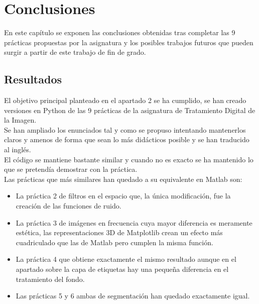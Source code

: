 \chapter{Conclusiones}
En este capítulo se exponen las conclusiones obtenidas tras completar las 9 prácticas propuestas por la asignatura y los posibles trabajos futuros que pueden surgir a partir de este trabajo de fin de grado. 

\section{Resultados}
El objetivo principal planteado en el apartado 2 se ha cumplido, se han creado versiones en Python de las 9 prácticas de la asignatura de Tratamiento Digital de la Imagen.\\

Se han ampliado los enunciados tal y como se propuso intentando mantenerlos claros y amenos de forma que sean lo más didácticos posible y se han traducido al inglés.\\

El código se mantiene bastante similar y cuando no es exacto se ha mantenido lo que se pretendía demostrar con la práctica.\\

Las prácticas que más similares han quedado a su equivalente en Matlab son:
\begin{itemize}
    \item La práctica 2 de filtros en el espacio que, la única modificación, fue la creación de las funciones de ruido.
    \item La práctica 3 de imágenes en frecuencia cuya mayor diferencia es meramente estética, las representaciones 3D de Matplotlib crean un efecto más cuadriculado que las de Matlab pero cumplen la misma función.
    \item La práctica 4 que obtiene exactamente el mismo resultado aunque en el apartado sobre la capa de etiquetas hay una pequeña diferencia en el tratamiento del fondo.
    \item Las prácticas 5 y 6 ambas de segmentación han quedado exactamente igual.\\
\end{itemize}

